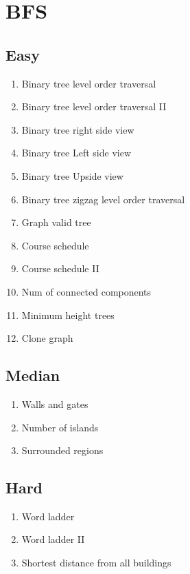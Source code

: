 \documentclass[DIV=calc, paper=a4, fontsize=11pt, twocolumn]{scrartcl}	 %
\begin{document}

\section*{BFS}

\subsection*{Easy}
\begin{enumerate}
\item Binary tree level order traversal \cite{102}
\item Binary tree level order traversal II \cite{107}
\item Binary tree right side view \cite{199}
\item Binary tree Left side view
\item Binary tree Upside view
\item Binary tree zigzag level order traversal \cite{103}
\item Graph valid tree \cite{261}
\item Course schedule \cite{207}
\item Course schedule II \cite{210}
\item Num of connected components \cite{323}
\item Minimum height trees \cite{310}
\item Clone graph \cite{133}
\end{enumerate}

\subsection*{Median}
\begin{enumerate}
\item Walls and gates
\item Number of islands
\item Surrounded regions
\end{enumerate}

\subsection*{Hard}
\begin{enumerate}
\item Word ladder 
\item Word ladder II
\item Shortest distance from all buildings
\end{enumerate}
\end{document}
